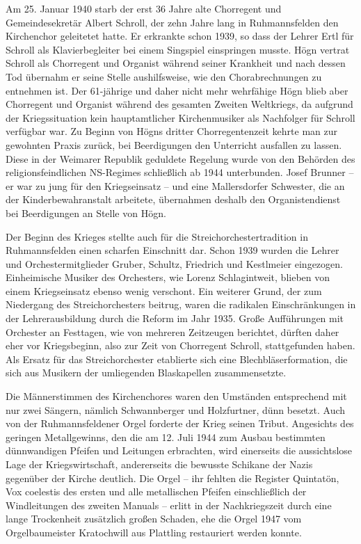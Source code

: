 \documentclass{book}
\begin{document}
Am 25. Januar 1940 starb der erst 36 Jahre alte Chorregent und
Gemeindesekretär Albert Schroll, der zehn Jahre lang in
Ruhmannsfelden den Kirchenchor geleitetet hatte. Er erkrankte schon
1939, so dass der Lehrer Ertl für Schroll als Klavierbegleiter bei
einem Singspiel einspringen musste. Högn vertrat Schroll als
Chorregent und Organist während seiner Krankheit und nach dessen Tod
übernahm er seine Stelle aushilfsweise, wie den Chorabrechnungen zu
entnehmen ist. Der 61-jährige und daher nicht mehr wehrfähige Högn
blieb aber Chorregent und Organist während des gesamten Zweiten
Weltkriegs, da aufgrund der Kriegssituation kein hauptamtlicher
Kirchenmusiker als Nachfolger für Schroll verfügbar war. Zu Beginn von
Högns dritter Chorregentenzeit kehrte man zur gewohnten Praxis
zurück, bei Beerdigungen den Unterricht ausfallen zu lassen. Diese in
der Weimarer Republik geduldete Regelung wurde von den Behörden des
religionsfeindlichen NS-Regimes schließlich ab 1944 unterbunden.
Josef Brunner – er war zu jung für den Kriegseinsatz – und eine
Mallersdorfer Schwester, die an der Kinderbewahranstalt arbeitete,
übernahmen deshalb den Organistendienst bei Beerdigungen an Stelle von
Högn.

Der Beginn des Krieges stellte auch für die Streichorchestertradition in
Ruhmannsfelden einen scharfen Einschnitt dar. Schon 1939 wurden die
Lehrer und Orchestermitglieder Gruber, Schultz, Friedrich und
Kestlmeier eingezogen. Einheimische Musiker des Orchesters, wie
Lorenz Schlagintweit, blieben von einem Kriegseinsatz ebenso wenig
verschont. Ein weiterer Grund, der zum Niedergang des Streichorchesters
beitrug, waren die radikalen Einschränkungen in der Lehrerausbildung
durch die Reform im Jahr 1935. Große Aufführungen mit Orchester an
Festtagen, wie von mehreren Zeitzeugen berichtet, dürften daher eher
vor Kriegsbeginn, also zur Zeit von Chorregent Schroll, stattgefunden
haben. Als Ersatz für das Streichorchester etablierte sich eine
Blechbläserformation, die sich aus Musikern der umliegenden
Blaskapellen zusammensetzte.

Die Männerstimmen des Kirchenchores waren den Umständen entsprechend
mit nur zwei Sängern, nämlich Schwannberger und Holzfurtner, dünn
besetzt. Auch von der Ruhmannsfeldener Orgel forderte der Krieg seinen
Tribut. Angesichts des geringen Metallgewinns, den die am 12. Juli 1944
zum Ausbau bestimmten dünnwandigen Pfeifen und Leitungen erbrachten,
wird einerseits die aussichtslose Lage der Kriegswirtschaft,
andererseits die bewusste Schikane der Nazis gegenüber der Kirche
deutlich. Die Orgel – ihr fehlten die Register Quintatön, Vox coelestis
des ersten und alle metallischen Pfeifen einschließlich der
Windleitungen des zweiten Manuals – erlitt in der Nachkriegszeit
durch eine lange Trockenheit zusätzlich großen Schaden, ehe die Orgel
1947 vom Orgelbaumeister Kratochwill aus Plattling restauriert werden
konnte.
\end{document}

